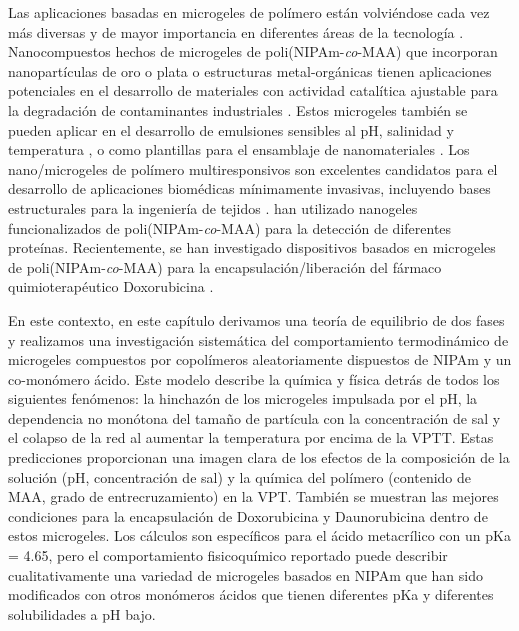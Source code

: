 Las aplicaciones basadas en microgeles de pol\'imero est\'an volvi\'endose cada vez m\'as diversas y de mayor importancia en diferentes \'areas de la tecnolog\'ia \cite{plamper2017functional}.
Nanocompuestos hechos de microgeles de poli(NIPAm-\emph{co}-MAA) que incorporan nanopart\'iculas de oro o plata o estructuras metal-org\'anicas tienen aplicaciones potenciales en el desarrollo de materiales con actividad catal\'itica ajustable para la degradaci\'on de contaminantes industriales \cite{Khan2013synthesis,Shi2014,Allegretto2020}.
Estos microgeles tambi\'en se pueden aplicar en el desarrollo de emulsiones sensibles al pH, salinidad y temperatura \cite{Ngai2005,Ngai2006,Brugger2008,Schmidt2011}, o como plantillas para el ensamblaje de nanomateriales \cite{Wong2009}.
Los nano/microgeles de pol\'imero multiresponsivos son excelentes candidatos para el desarrollo de aplicaciones biom\'edicas m\'inimamente invasivas, incluyendo bases estructurales para la ingenier\'ia de tejidos \cite{Daly2020}.
\citet{Culver2017A} han utilizado nanogeles funcionalizados de poli(NIPAm-\emph{co}-MAA) para la detecci\'on de diferentes prote\'inas.
Recientemente, se han investigado dispositivos basados en microgeles de poli(NIPAm-\emph{co}-MAA) para la encapsulaci\'on/liberaci\'on del f\'armaco quimioterap\'eutico Doxorubicina \cite{Giussi2020,MartinezMoro2020,Pergushov2020}.

En este contexto, en este cap\'itulo derivamos una teor\'ia de equilibrio de dos fases y realizamos una investigaci\'on sistem\'atica del comportamiento termodin\'amico de microgeles compuestos por copol\'imeros aleatoriamente dispuestos de NIPAm y un co-mon\'omero \'acido.
Este modelo describe la qu\'imica y f\'isica detr\'as de todos los siguientes fen\'omenos: la hinchaz\'on de los microgeles impulsada por el pH, la dependencia no mon\'otona del tama\~no de part\'icula con la concentraci\'on de sal y el colapso de la red al aumentar la temperatura por encima de la VPTT.
Estas predicciones proporcionan una imagen clara de los efectos de la composici\'on de la soluci\'on (pH, concentraci\'on de sal) y la qu\'imica del pol\'imero (contenido de MAA, grado de entrecruzamiento) en la VPT.
Tambi\'en se muestran las mejores condiciones para la encapsulaci\'on de Doxorubicina y Daunorubicina dentro de estos microgeles.
Los  c\'alculos son espec\'ificos para el \'acido metacr\'ilico con un pKa = 4.65, pero el comportamiento fisicoqu\'imico reportado puede describir cualitativamente una variedad de microgeles basados en NIPAm que han sido modificados con otros mon\'omeros \'acidos que tienen diferentes pKa y diferentes solubilidades a pH bajo.


